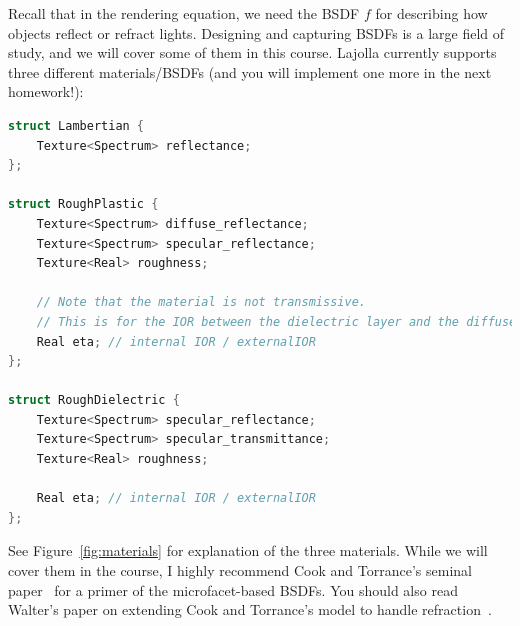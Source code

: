 \documentclass{article}
\begin{document}
Recall that in the rendering equation, we need the BSDF $f$ for describing how objects reflect or refract lights. Designing and capturing BSDFs is a large field of study, and we will cover some of them in this course. Lajolla currently supports three different materials/BSDFs (and you will implement one more in the next homework!):
\begin{lstlisting}[language=c++]
struct Lambertian {
    Texture<Spectrum> reflectance;
};

struct RoughPlastic {
    Texture<Spectrum> diffuse_reflectance;
    Texture<Spectrum> specular_reflectance;
    Texture<Real> roughness;

    // Note that the material is not transmissive.
    // This is for the IOR between the dielectric layer and the diffuse layer.
    Real eta; // internal IOR / externalIOR
};

struct RoughDielectric {
    Texture<Spectrum> specular_reflectance;
    Texture<Spectrum> specular_transmittance;
    Texture<Real> roughness;

    Real eta; // internal IOR / externalIOR
};
\end{lstlisting}

See Figure~\ref{fig:materials} for explanation of the three materials. While we will cover them in the course, I highly recommend Cook and Torrance's seminal paper~\cite{Cook:1982:RMC} for a primer of the microfacet-based BSDFs. You should also read Walter's paper on extending Cook and Torrance's model to handle refraction~\cite{Walter:2007:MMR}.
\end{document}
